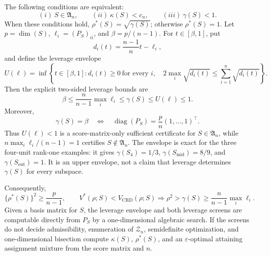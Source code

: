 The following conditions are equivalent:
\[
(i)\ S\in\mathfrak A_n,
\qquad
(ii)\ \kappa(S)<c_n,
\qquad
(iii)\ \gamma(S)<1.
\]
When these conditions hold, \(\rho^*(S)=\sqrt{\gamma(S)}\); otherwise \(\rho^*(S)=1\).  Let \(p=\dim(S)\), \(\ell_i=(P_S)_{ii}\), and \(\beta=p/(n-1)\).  For \(t\in[\beta,1]\), put
\[
d_i(t)=\frac{n-1}{n}t-\ell_i,
\]
and define the leverage envelope
\[
U(\ell)=\inf\left\{t\in[\beta,1]:d_i(t)\geq0\ \text{for every }i,\quad
2\max_i\sqrt{d_i(t)}\leq\sum_{i=1}^n\sqrt{d_i(t)}\right\}.
\]
Then the explicit two-sided leverage bounds are
\[
\beta\leq \frac{n}{n-1}\max_i\ell_i
\leq\gamma(S)\leq U(\ell)\leq1.
\]
Moreover,
\[
\gamma(S)=\beta
\quad\Longleftrightarrow\quad
\operatorname{diag}(P_S)=\frac{p}{n}(1,\ldots,1)^\top.
\]
Thus \(U(\ell)<1\) is a score-matrix-only sufficient certificate for \(S\in\mathfrak A_n\), while \(n\max_i\ell_i/(n-1)=1\) certifies \(S\notin\mathfrak A_n\).  The envelope is exact for the three four-unit rank-one examples: it gives \(\gamma(S_4)=1/3\), \(\gamma(S_{\mathrm{mid}})=8/9\), and \(\gamma(S_{\mathrm{out}})=1\).  It is an upper envelope, not a claim that leverage determines \(\gamma(S)\) for every subspace.

Consequently,
\[
\{\rho^*(S)\}^2\geq\frac{p}{n-1},
\qquad
V^*(\rho;S)<V_{\mathrm{CRD}}(\rho;S)
\Longrightarrow
\rho^2>\gamma(S)\geq\frac{n}{n-1}\max_i\ell_i.
\]
Given a basis matrix for \(S\), the leverage envelope and both leverage screens are computable directly from \(P_S\) by a one-dimensional algebraic search.  If the screens do not decide admissibility, enumeration of \(\mathcal Z_n\), semidefinite optimization, and one-dimensional bisection compute \(\kappa(S)\), \(\rho^*(S)\), and an \(\varepsilon\)-optimal attaining assignment mixture from the score matrix and \(n\).